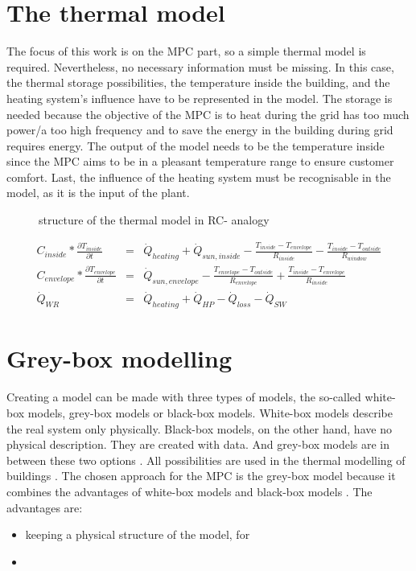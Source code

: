 \section{The thermal model}
\label{thermalmodel}

    The focus of this work is on the MPC part, so a simple thermal model is required. Nevertheless, no necessary information must be missing. In this case, the thermal storage possibilities, the temperature inside the building, and the heating system's influence have to be represented in the model. The storage is needed because the objective of the MPC is to heat during the grid has too much power/a too high frequency and to save the energy in the building during grid requires energy. The output of the model needs to be the temperature inside since the MPC aims to be in a pleasant temperature range to ensure customer comfort. Last, the influence of the heating system must be recognisable in the model, as it is the input of the plant. 
    \newline
    \begin{figure}
        \centering
        \def\svgwidth{320pt}
        
        \caption{structure of the thermal model in RC- analogy}
        \label{fig:structureThermalModel}
    \end{figure}
    \begin{align}
       \label{eq:meinModel} 
       C_{inside}*\frac{\partial T_{inside}}{\partial t} &=& \dot{Q}_{heating} + \dot{Q}_{sun,inside} - \frac{T_{inside}-T_{envelope}}{R_{inside}} - \frac{T_{inside}-T_{outside}}{R_{window}}\\
       C_{envelope}*\frac{\partial T_{envelope}}{\partial t} &=& \dot{Q}_{sun,envelope} - \frac{T_{envelope}-T_{outside}}{R_{envelope}} + \frac{T_{inside}-T_{envelope}}{R_{inside}} \nonumber \\
       \dot{Q}_{WR}&=& \dot{Q}_{heating} + \dot{Q}_{HP} - \dot{Q}_{loss} - \dot{Q}_{SW} \nonumber
    \end{align}

\section{Grey-box modelling}
\label{Grey-box modelling}

Creating a model can be made with three types of models, the so-called white-box models, grey-box models or black-box models. White-box models describe the real system only physically. Black-box models, on the other hand, have no physical description. They are created with data. And grey-box models are in between these two options \cite{Statusseminar.ForschungfurEnergieoptimiertesBauen.2009}. All possibilities are used in the thermal modelling of buildings \cite{Kramer.2012}.
\newline
The chosen approach for the MPC is the grey-box model because it combines the advantages of white-box models and black-box models \cite{EstradaFlores.2006}. The advantages are:
\begin{itemize}
 \item keeping a physical structure of the model, for 
 \item 
\end{itemize}

